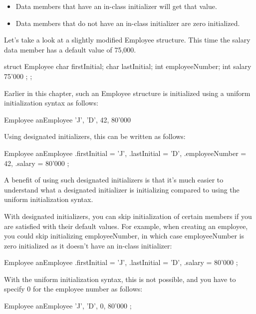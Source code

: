 \begin{itemize}
\item
Data members that have an in-class initializer will get that value.

\item
Data members that do not have an in-class initializer are zero initialized.
\end{itemize}

Let’s take a look at a slightly modified Employee structure. This time the salary data member has a default value of 75,000.

\begin{cpp}
struct Employee {
    char firstInitial;
    char lastInitial;
    int employeeNumber;
    int salary { 75'000 };
};
\end{cpp}

Earlier in this chapter, such an Employee structure is initialized using a uniform initialization syntax as follows:

\begin{cpp}
Employee anEmployee { 'J', 'D', 42, 80'000 }
\end{cpp}

Using designated initializers, this can be written as follows:

\begin{cpp}
Employee anEmployee {
    .firstInitial = 'J',
    .lastInitial = 'D',
    .employeeNumber = 42,
    .salary = 80'000
};
\end{cpp}

A benefit of using such designated initializers is that it’s much easier to understand what a designated initializer is initializing compared to using the uniform initialization syntax.

With designated initializers, you can skip initialization of certain members if you are satisfied with their default values. For example, when creating an employee, you could skip initializing employeeNumber, in which case employeeNumber is zero initialized as it doesn’t have an in-class initializer:

\begin{cpp}
Employee anEmployee {
    .firstInitial = 'J',
    .lastInitial = 'D',
    .salary = 80'000
};
\end{cpp}

With the uniform initialization syntax, this is not possible, and you have to specify 0 for the employee number as follows:

\begin{cpp}
Employee anEmployee { 'J', 'D', 0, 80'000 };
\end{cpp}

